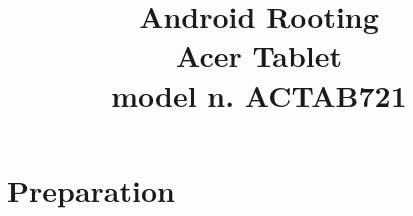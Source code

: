 \documentclass[a4paper,14.50pt]{book} \usepackage{color} \usepackage[usenames,dvipsnames,svgnames,table,x11names]{xcolor}
\begin{document}
\title{%
Android Rooting\\
\large  Acer Tablet\\
\small model n. ACTAB721}
\maketitle
\hypersetup{linkcolor=blue}


\renewcommand{\headrulewidth}{0.2pt}

\part{Preparation}




\end{document}

